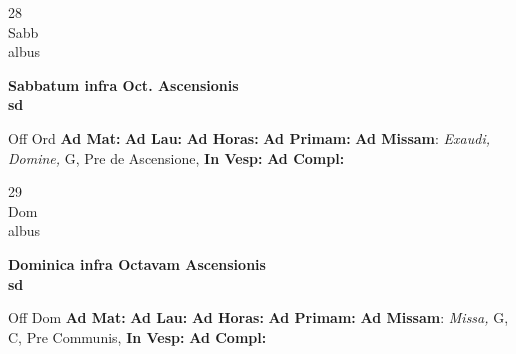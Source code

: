 \documentclass[10pt, openany]{book}
\begin{document}
    \begin{center}
        \begin{minipage}{3.5in}
            \vspace{2em}
            \begin{minipage}{0.5in}
                {\Huge 28} \\
                {\normalsize Sabb} \\
                {\normalsize albus}
            \end{minipage}
            \begin{minipage}{3.0in}
                \textbf{ \large Sabbatum infra Oct. Ascensionis \\
                \textnormal{\normalsize sd}} \\ 
            \end{minipage}
            \begin{justify}Off Ord
                \textbf{Ad Mat: }
                \textbf{Ad Lau: }
                \textbf{Ad Horas: }
                \textbf{Ad Primam: }\textbf{Ad Missam}: \textit{Exaudi, Domine,} G, Pre de Ascensione,  
                \textbf{In Vesp: }
                \textbf{Ad Compl: }
            \end{justify}
        \end{minipage}
    \end{center}

    \begin{center}
        \begin{minipage}{3.5in}
            \vspace{2em}
            \begin{minipage}{0.5in}
                {\Huge 29} \\
                {\normalsize Dom} \\
                {\normalsize albus}
            \end{minipage}
            \begin{minipage}{3.0in}
                \textbf{ \large Dominica infra Octavam Ascensionis \\
                \textnormal{\normalsize sd}} \\ 
            \end{minipage}
            \begin{justify}Off Dom
                \textbf{Ad Mat: }
                \textbf{Ad Lau: }
                \textbf{Ad Horas: }
                \textbf{Ad Primam: }\textbf{Ad Missam}: \textit{Missa,} G, C, Pre Communis,  
                \textbf{In Vesp: }
                \textbf{Ad Compl: }
            \end{justify}
        \end{minipage}
    \end{center}
\end{document}
